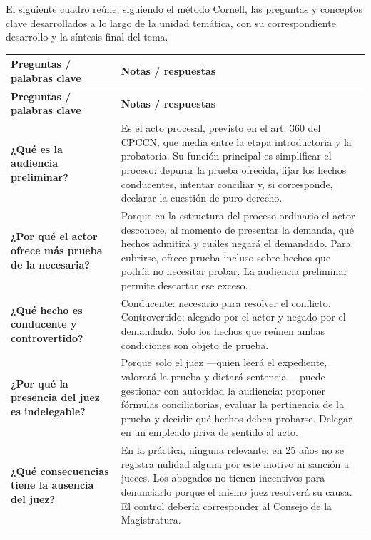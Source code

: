 \documentclass[12pt,oneside]{book}
\begin{document}
El siguiente cuadro reúne, siguiendo el método Cornell, las preguntas y conceptos clave desarrollados a lo largo de la unidad temática, con su correspondiente desarrollo y la síntesis final del tema.

\begin{longtable}{
    >{\raggedright\arraybackslash}p{}
    >{\raggedright\arraybackslash}p{}
}
\toprule
\textbf{Preguntas / palabras clave} & \textbf{Notas / respuestas} \\
\midrule
\endfirsthead

\toprule
\textbf{Preguntas / palabras clave} & \textbf{Notas / respuestas} \\
\midrule
\endhead

\textbf{¿Qué es la audiencia preliminar?} &
Es el acto procesal, previsto en el art. 360 del CPCCN, que media entre la etapa introductoria y la probatoria. Su función principal es simplificar el proceso: depurar la prueba ofrecida, fijar los hechos conducentes, intentar conciliar y, si corresponde, declarar la cuestión de puro derecho. \\
\addlinespace

\textbf{¿Por qué el actor ofrece más prueba de la necesaria?} &
Porque en la estructura del proceso ordinario el actor desconoce, al momento de presentar la demanda, qué hechos admitirá y cuáles negará el demandado. Para cubrirse, ofrece prueba incluso sobre hechos que podría no necesitar probar. La audiencia preliminar permite descartar ese exceso. \\
\addlinespace

\textbf{¿Qué hecho es conducente y controvertido?} &
Conducente: necesario para resolver el conflicto. Controvertido: alegado por el actor y negado por el demandado. Solo los hechos que reúnen ambas condiciones son objeto de prueba. \\
\addlinespace

\textbf{¿Por qué la presencia del juez es indelegable?} &
Porque solo el juez —quien leerá el expediente, valorará la prueba y dictará sentencia— puede gestionar con autoridad la audiencia: proponer fórmulas conciliatorias, evaluar la pertinencia de la prueba y decidir qué hechos deben probarse. Delegar en un empleado priva de sentido al acto. \\
\addlinespace

\textbf{¿Qué consecuencias tiene la ausencia del juez?} &
En la práctica, ninguna relevante: en 25 años no se registra nulidad alguna por este motivo ni sanción a jueces. Los abogados no tienen incentivos para denunciarlo porque el mismo juez resolverá su causa. El control debería corresponder al Consejo de la Magistratura. \\
\addlinespace


\end{longtable}
\end{document}
